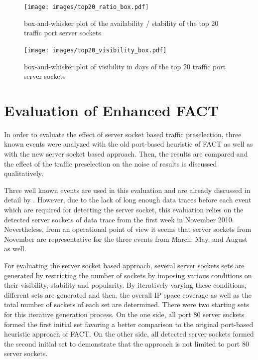 \begin{landscape}
	\begin{figure}
		[p] \centering 
		\texttt{[image: images/top20\_ratio\_box.pdf]} \caption{box-and-whisker plot of the availability / stability of the top 20 traffic port server sockets} 
		\label{fig:top20_ratio_box} 
	\end{figure}
\end{landscape}
\begin{landscape}
	\begin{figure}
		[p] \centering 
		\texttt{[image: images/top20\_visibility\_box.pdf]} \caption{box-and-whisker plot of visibility in days of the top 20 traffic port server sockets} 
		\label{fig:top20_visibledays_box} 
	\end{figure}
\end{landscape}

\newpage
\section{Evaluation of Enhanced FACT\label{section:enhanced_FACT_eval}} 
In order to evaluate the effect of \gls{server socket} based traffic preselection, three known events were analyzed with the old port-based heuristic of \gls{FACT} as well as with the new \gls{server socket} based approach. 
Then, the results are compared and the effect of the traffic preselection on the noise of results is discussed qualitatively.

Three well known events are used in this evaluation and are already discussed in detail by \citet{SchatzmannPAM2011}. 
However, due to the lack of long enough data traces before each event which are required for detecting the \gls{server socket}, this evaluation relies on the detected \glspl{server socket} of data trace from the first week in November 2010. 
Nevertheless, from an operational point of view it seems that \glspl{server socket} from November are representative for the three events from March, May, and August as well.

For evaluating the \gls{server socket} based approach, several \glspl{server socket} sets are generated by restricting the number of sockets by imposing various conditions on their visibility, stability and popularity. 
By iteratively varying these conditions, different sets are generated and then, the overall IP space coverage as well as the total number of sockets of each set are determined. 
There were two starting sets for this iterative generation process. 
On the one side, all port 80 \glspl{server socket} formed the first initial set favoring a better comparison to the original port-based heuristic approach of FACT. 
On the other side, all detected \glspl{server socket} formed the second initial set to demonstrate that the approach is not limited to port 80 \glspl{server socket}. 

